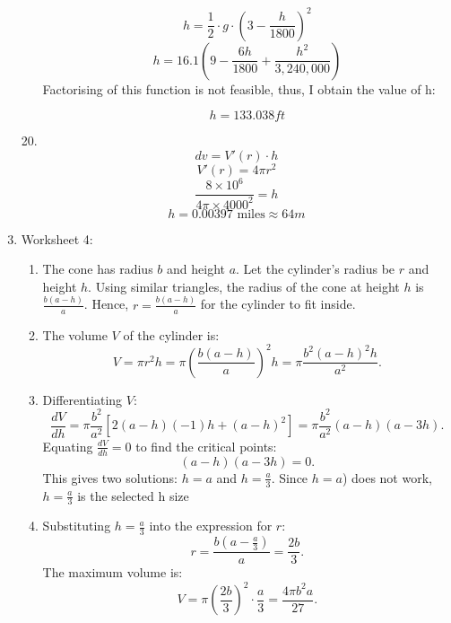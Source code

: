 \documentclass[12pt]{article}
\begin{document}
\begin{enumerate}[start=1,label={\bfseries. },leftmargin=1in]
\begin{enumerate}
    \[
    h = \frac{1}{2} \cdot g \cdot \left(3-\frac{h}{1800}\right)^2
    \]
    \[
    h = 16.1\left(9 - \frac{6h}{1800} + \frac{h^2}{3,240,000}\right)
    \]
    Factorising of this function is not feasible, thus, I obtain the value of h:

    \[
    h =133.038 ft
    \]
\end{enumerate}

\item [20.]
\[
dv = V'(r) \cdot h
\]
\[
V'(r) = 4\pi r^2
\]
\[
\frac{8 \times 10^6}{4 \pi \times 4000^2} = h
\]
\[
h = 0.00397 \text{ miles} \approx 64 m
\]

\item Worksheet 4:
\begin{enumerate}
    \item
    The cone has radius \(b\) and height \(a\). Let the cylinder's radius be \(r\) and height \(h\). Using similar triangles, the radius of the cone at height \(h\) is \(\frac{b(a-h)}{a}\). Hence, \(r = \frac{b(a-h)}{a}\) for the cylinder to fit inside.
    
    \item  
    The volume \(V\) of the cylinder is:
    \[
    V = \pi r^2 h = \pi \left(\frac{b(a-h)}{a}\right)^2 h = \pi \frac{b^2 (a-h)^2 h}{a^2}.
    \]

    \item  
    Differentiating \(V\):
    \[
    \frac{dV}{dh} = \pi \frac{b^2}{a^2} \left[ 2(a-h)(-1) h + (a-h)^2 \right] = \pi \frac{b^2}{a^2} (a-h)(a - 3h).
    \]
    Equating \(\frac{dV}{dh} = 0\) to find the critical points:  
    \[
    (a-h)(a - 3h) = 0.
    \]     This gives two solutions: \(h = a\) and \(h = \frac{a}{3}\). Since \(h = a\)) does not work, \(h = \frac{a}{3}\) is the selected h size

    \item 
    Substituting \(h = \frac{a}{3}\) into the expression for \(r\):
    \[
    r = \frac{b(a - \frac{a}{3})}{a} = \frac{2b}{3}.
    \]
    The maximum volume is:
    \[
    V = \pi \left(\frac{2b}{3}\right)^2 \cdot \frac{a}{3} = \frac{4\pi b^2 a}{27}.
    \]
\end{enumerate}

\end{enumerate}
\end{document}
